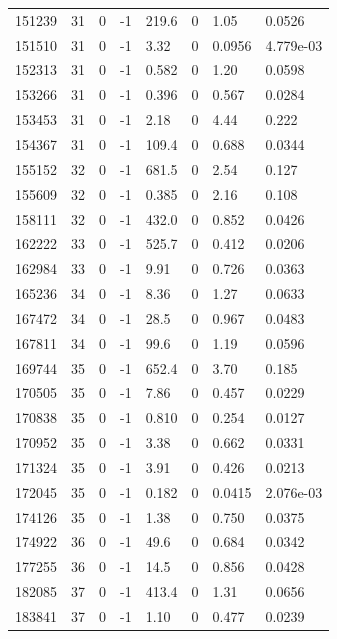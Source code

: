 \documentclass[preview]{standalone}
\begin{document}
{{{{\begin{tabular}{L{1.2cm}C{1.2cm} C{0.3cm}C{0.5cm} C{1.4cm}C{1.4cm} C{1.4cm}C{1.4cm}}
  151239  &    31  & 0     & -1 &  219.6  & 0  & 1.05 &  0.0526   \\ 
  151510  &    31  & 0     & -1 &  3.32  & 0  & 0.0956 &  4.779e-03   \\ 
  152313  &    31  & 0     & -1 &  0.582  & 0  & 1.20 &  0.0598   \\ 
  153266  &    31  & 0     & -1 &  0.396  & 0  & 0.567 &  0.0284   \\ 
  153453  &    31  & 0     & -1 &  2.18  & 0  & 4.44 &  0.222   \\ 
  154367  &    31  & 0     & -1 &  109.4  & 0  & 0.688 &  0.0344   \\ 
  155152  &    32  & 0     & -1 &  681.5  & 0  & 2.54 &  0.127   \\ 
  155609  &    32  & 0     & -1 &  0.385  & 0  & 2.16 &  0.108   \\ 
  158111  &    32  & 0     & -1 &  432.0  & 0  & 0.852 &  0.0426   \\ 
  162222  &    33  & 0     & -1 &  525.7  & 0  & 0.412 &  0.0206   \\ 
  162984  &    33  & 0     & -1 &  9.91  & 0  & 0.726 &  0.0363   \\ 
  165236  &    34  & 0     & -1 &  8.36  & 0  & 1.27 &  0.0633   \\ 
  167472  &    34  & 0     & -1 &  28.5  & 0  & 0.967 &  0.0483   \\ 
  167811  &    34  & 0     & -1 &  99.6  & 0  & 1.19 &  0.0596   \\ 
  169744  &    35  & 0     & -1 &  652.4  & 0  & 3.70 &  0.185   \\ 
  170505  &    35  & 0     & -1 &  7.86  & 0  & 0.457 &  0.0229   \\ 
  170838  &    35  & 0     & -1 &  0.810  & 0  & 0.254 &  0.0127   \\ 
  170952  &    35  & 0     & -1 &  3.38  & 0  & 0.662 &  0.0331   \\ 
  171324  &    35  & 0     & -1 &  3.91  & 0  & 0.426 &  0.0213   \\ 
  172045  &    35  & 0     & -1 &  0.182  & 0  & 0.0415 &  2.076e-03   \\ 
  174126  &    35  & 0     & -1 &  1.38  & 0  & 0.750 &  0.0375   \\ 
  174922  &    36  & 0     & -1 &  49.6  & 0  & 0.684 &  0.0342   \\ 
  177255  &    36  & 0     & -1 &  14.5  & 0  & 0.856 &  0.0428   \\ 
  182085  &    37  & 0     & -1 &  413.4  & 0  & 1.31 &  0.0656   \\ 
  183841  &    37  & 0     & -1 &  1.10  & 0  & 0.477 &  0.0239   \\ 
\hline 
\end{tabular} 

}}}}
\end{document}
